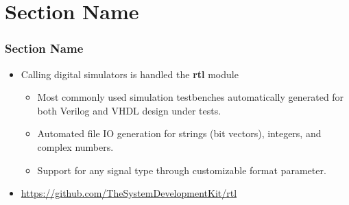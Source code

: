 \documentclass{sdkslides}
\newcommand{\sectname}{Section Name}
\begin{document}
\section{\sectname}
\begin{frame}[t]
    \frametitle{\sectname}
    \begin{itemize}
        \item Calling digital simulators is handled the \textbf{rtl} module
        \begin{itemize}
            \item Most commonly used simulation testbenches automatically
                generated for both Verilog and VHDL design under tests.
            \item Automated file IO generation for strings (bit vectors), integers, and complex numbers. 
            \item Support for any signal type through customizable format
                parameter.
        \end{itemize}
        \item \url{https://github.com/TheSystemDevelopmentKit/rtl}
    \end{itemize}
\end{frame}
\end{document}
